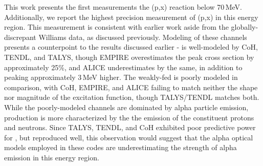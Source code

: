 This work presents the first measurements the (p,x) reaction below 70\,MeV.
Additionally, we report the highest precision measurement of (p,x) in this energy region.
This measurement is consistent with earlier work aside from the globally-discrepant Williams data, as discussed previously.
Modeling of these channels presents a counterpoint to the  results discussed earlier -  is   well-modeled by CoH, TENDL, and TALYS, though EMPIRE overestimates the peak cross section by approximately 25\%, and ALICE underestimates by the same, in addition to peaking approximately 3\,MeV higher.
The weakly-fed  is poorly modeled in comparison, with CoH, EMPIRE, and ALICE failing to match neither the shape nor magnitude of the excitation function, though TALYS/TENDL matches both.
While the poorly-modeled  channels are dominated by alpha particle emission,   production is more characterized by the the emission of the constituent protons and neutrons.
Since TALYS, TENDL, and CoH exhibited poor predictive power for , but reproduced  well, this observation would suggest that the alpha optical models employed in these codes are underestimating the strength of alpha emission in this energy region. 


